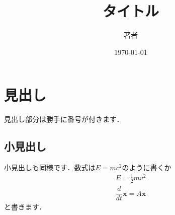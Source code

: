 \documentclass[11pt,a4paper,uplatex]{jsarticle}
\title{タイトル}
\author{著者}
\date{\today}
\begin{document}
    \maketitle
    \section{見出し}
        見出し部分は勝手に番号が付きます．
            \subsection{小見出し}
                小見出しも同様です．数式は$E=mc^{2}$のように書くか
                    \begin{align*}
                        E=\frac{1}{2}mv^{2}\\
                        \dfrac{d}{dt}\bm{x} = A\bm{x}
                    \end{align*}
                と書きます．
\end{document}
